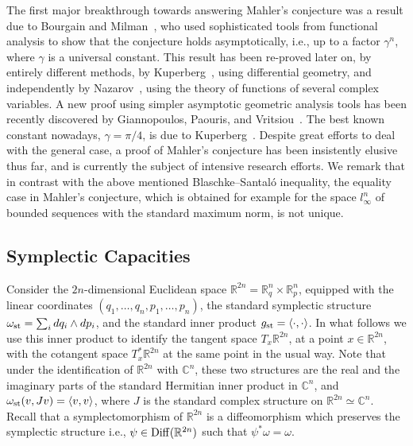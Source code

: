 \documentclass[11pt]{article}
\begin{document}
The first major breakthrough towards answering Mahler's conjecture was a result 
due to Bourgain and Milman~\cite{BM}, who  used sophisticated tools from functional analysis to
show that the conjecture holds asymptotically, i.e., up to a factor
$\gamma^n$, where $\gamma$ is a universal constant. 
This result has been re-proved later on, by entirely different methods, by Kuperberg~\cite{Ku}, using differential geometry, 
and independently by Nazarov~\cite{Naz},  using the theory of functions of several complex variables. A new proof using simpler asymptotic geometric analysis tools has been recently discovered by Giannopoulos, Paouris, and Vritsiou~\cite{GPV}. 
The best known constant nowadays, $\gamma = \pi/4$, is due to Kuperberg~\cite{Ku}.
Despite great efforts to deal with the general case, a proof of Mahler's conjecture has been insistently elusive thus far, and is currently the subject of intensive research efforts.
We remark that in
contrast with the above mentioned Blaschke--Santal\'o inequality, the equality case
in Mahler's conjecture, which is obtained for example for the space
$l^n_{\infty}$ of bounded sequences with the standard maximum norm,
is not unique.




\subsection{Symplectic Capacities} \label{subsection-capacities}

Consider the $2n$-dimensional Euclidean space ${\mathbb R}^{2n}  =
{\mathbb R}^n_q \times {\mathbb R}^n_p$,  equipped with the linear
coordinates $(q_1,\ldots, q_n,p_1,\ldots,p_n)$,  the standard
symplectic structure $\omega_{\rm st} = \sum_i dq_i \wedge dp_i$, and  the
standard inner product $g_{\rm st} = \langle \cdot, \cdot \rangle$.  In what follows we use this inner product to identify 
the tangent space $T_x {\mathbb R}^{2n}$, at a point $x \in {\mathbb R}^{2n}$, with the cotangent space $T^*_x {\mathbb R}^{2n}$ at the same point in the usual way.
Note
that under the identification of ${\mathbb R}^{2n}$ with
${\mathbb C}^n$, these two structures are the real and the imaginary
parts of the standard Hermitian inner product in ${\mathbb  C}^n$,
and $\omega_{\rm st}(v,Jv) =  \langle v, v \rangle$, where $J$ is the
standard complex structure on ${\mathbb R}^{2n} \simeq {\mathbb
C}^n$. Recall that a symplectomorphism of ${\mathbb R}^{2n}$ is a
diffeomorphism which preserves the symplectic structure i.e., $\psi
\in {\rm Diff}({\mathbb R}^{2n})$ such that $\psi^* \omega =
\omega$. 
\end{document}
